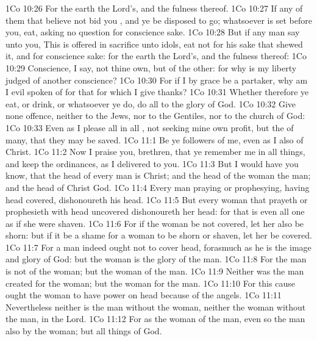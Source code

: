 \vs 1Co 10:26 For the earth  the Lord's, and the fulness thereof.
\vs 1Co 10:27 If any of them that believe not bid you , and ye be disposed to go; whatsoever is set before you, eat, asking no question for conscience sake.
\vs 1Co 10:28 But if any man say unto you, This is offered in sacrifice unto idols, eat not for his sake that shewed it, and for conscience sake: for the earth  the Lord's, and the fulness thereof:
\vs 1Co 10:29 Conscience, I say, not thine own, but of the other: for why is my liberty judged of another  conscience?
\vs 1Co 10:30 For if I by grace be a partaker, why am I evil spoken of for that for which I give thanks?
\vs 1Co 10:31 Whether therefore ye eat, or drink, or whatsoever ye do, do all to the glory of God.
\vs 1Co 10:32 Give none offence, neither to the Jews, nor to the Gentiles, nor to the church of God:
\vs 1Co 10:33 Even as I please all  in all , not seeking mine own profit, but the  of many, that they may be saved.
\vs 1Co 11:1 Be ye followers of me, even as I also  of Christ.
\vs 1Co 11:2 Now I praise you, brethren, that ye remember me in all things, and keep the ordinances, as I delivered  to you.
\vs 1Co 11:3 But I would have you know, that the head of every man is Christ; and the head of the woman  the man; and the head of Christ  God.
\vs 1Co 11:4 Every man praying or prophesying, having  head covered, dishonoureth his head.
\vs 1Co 11:5 But every woman that prayeth or prophesieth with  head uncovered dishonoureth her head: for that is even all one as if she were shaven.
\vs 1Co 11:6 For if the woman be not covered, let her also be shorn: but if it be a shame for a woman to be shorn or shaven, let her be covered.
\vs 1Co 11:7 For a man indeed ought not to cover  head, forasmuch as he is the image and glory of God: but the woman is the glory of the man.
\vs 1Co 11:8 For the man is not of the woman; but the woman of the man.
\vs 1Co 11:9 Neither was the man created for the woman; but the woman for the man.
\vs 1Co 11:10 For this cause ought the woman to have power on  head because of the angels.
\vs 1Co 11:11 Nevertheless neither is the man without the woman, neither the woman without the man, in the Lord.
\vs 1Co 11:12 For as the woman  of the man, even so  the man also by the woman; but all things of God.
